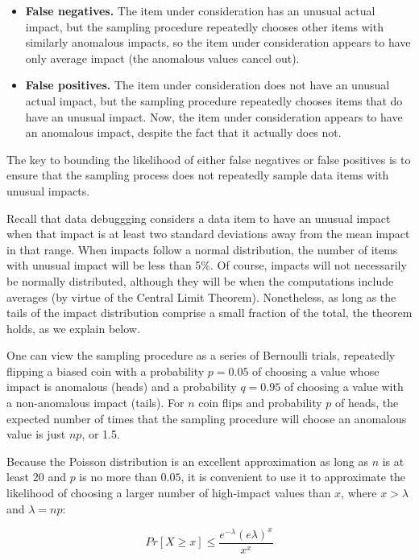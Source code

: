 \begin{itemize}
\item \textbf{False negatives.} The item under consideration has an
  unusual actual impact, but the sampling procedure repeatedly
  chooses other items with similarly anomalous impacts, so the item under
  consideration appears to have only average impact (the anomalous values cancel out).
\item \textbf{False positives.} The item under consideration does
  not have an unusual actual impact, but the sampling procedure
  repeatedly chooses items that do have an unusual impact. Now, the item
  under consideration appears to have an anomalous impact, despite the fact that it actually does not.
\end{itemize}

The key to bounding the likelihood of either false negatives or false
positives is to ensure that the sampling process does not repeatedly
sample data items with unusual impacts.

Recall that data debuggging considers a data item to have an unusual
impact when that impact is at least two standard deviations away from
the mean impact in that range. When impacts follow a normal
distribution, the number of items with unusual impact will be less
than 5\%. Of course, impacts will not necessarily be normally
distributed, although they will be when the computations include
averages (by virtue of the Central Limit Theorem). Nonetheless, as
long as the tails of the impact distribution comprise a small fraction
of the total, the theorem holds, as we explain below.

One can view the sampling procedure as a series of Bernoulli
trials, repeatedly flipping a biased coin with a probability $p =
0.05$ of choosing a value whose impact is anomalous (heads) and a
probability $q = 0.95$ of choosing a value with a non-anomalous impact
(tails). For $n$ coin flips and probability $p$ of heads, the expected
number of times that the sampling procedure will choose an anomalous
value is just $np$, or 1.5.

Because the Poisson distribution is an excellent approximation as long
as $n$ is at least 20 and $p$ is no more than $0.05$, it is convenient
to use it to approximate the likelihood of choosing a larger number of
high-impact values than $x$, where $x > \lambda$ and $\lambda = np$:

\begin{equation}
Pr[X \geq x] \leq \frac{e^{-\lambda}(e \lambda)^x}{x^x}
\end{equation}

